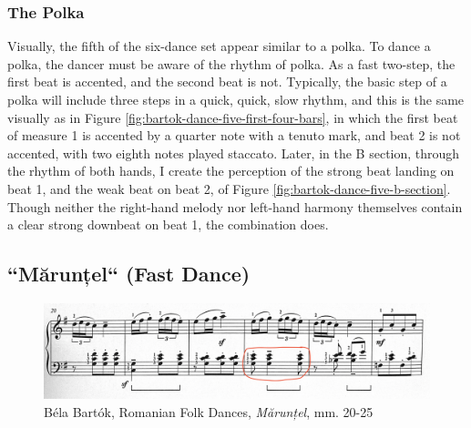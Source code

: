 \subsubsection{The Polka}

Visually, the fifth of the six-dance set appear similar to a polka. To dance a polka, the dancer must be aware of the rhythm of polka. As a fast two-step, the first beat is accented, and the second beat is not. Typically, the basic step of a polka will include three steps in a quick, quick, slow rhythm, and this is the same visually as in Figure \ref{fig:bartok-dance-five-first-four-bars}\autocite{Lung_2016}, in which the first beat of measure 1 is accented by a quarter note with a tenuto mark, and beat 2 is not accented, with two eighth notes played staccato. Later, in the B section, through the rhythm of both hands, I create the perception of the strong beat landing on beat 1, and the weak beat on beat 2, of Figure \ref{fig:bartok-dance-five-b-section}\autocite{Lung_2016}. Though neither the right-hand melody nor left-hand harmony themselves contain a clear strong downbeat on beat 1, the combination does. 

\subsection{``Mărunțel`` (Fast Dance)}

\begin{figure}
  \centering
  \includegraphics[width=\textwidth]{figures/bartok-dance-six-b-section-syncopation.jpg}
  \caption{Béla Bartók, Romanian Folk Dances, \textit{Mărunțel}, mm. 20-25}
  \label{fig:bartok-dance-six-b-section-syncopation}
\end{figure}


